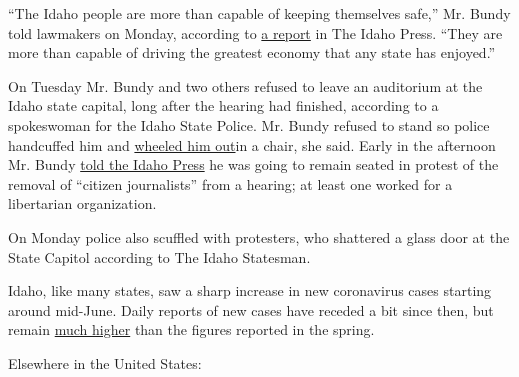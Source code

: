 ``The Idaho people are more than capable of keeping themselves safe,''
Mr. Bundy told lawmakers on Monday, according to
\href{https://www.idahopress.com/eyeonboise/house-judiciary-hears-testimony-on-liability-bills/article_361ae9cf-dbdf-531c-bb3a-29a0c8ffd587.html}{a
report} in The Idaho Press. ``They are more than capable of driving the
greatest economy that any state has enjoyed.''

On Tuesday Mr. Bundy and two others refused to leave an auditorium at
the Idaho state capital, long after the hearing had finished, according
to a spokeswoman for the Idaho State Police. Mr. Bundy refused to stand
so police handcuffed him and
\href{https://www.idahopress.com/news/local/ammon-bundy-arrested-at-idaho-capitol-removed-from-lincoln-auditorium/article_7dbf7efa-f703-5fc2-b4e9-477f1a2dbe87.html}{wheeled
him out}in a chair, she said. Early in the afternoon Mr. Bundy
\href{https://www.idahopress.com/news/local/ammon-bundy-arrested-at-idaho-capitol-removed-from-lincoln-auditorium/article_7dbf7efa-f703-5fc2-b4e9-477f1a2dbe87.html}{told
the Idaho Press} he was going to remain seated in protest of the removal
of ``citizen journalists'' from a hearing; at least one worked for a
libertarian organization.

On Monday police also scuffled with protesters, who shattered a glass
door at the State Capitol according to The Idaho Statesman.

Idaho, like many states, saw a sharp increase in new coronavirus cases
starting around mid-June. Daily reports of new cases have receded a bit
since then, but remain
\href{https://www.nytimes3xbfgragh.onion/interactive/2020/us/idaho-coronavirus-cases.html}{much
higher} than the figures reported in the spring.

Elsewhere in the United States:

